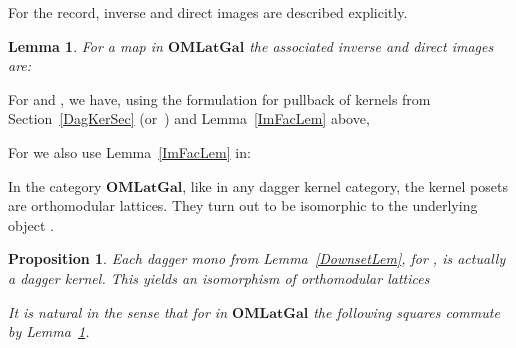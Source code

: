 \documentclass{article}
\newtheorem{lemma}[theorem]{Lemma}
\newtheorem{proposition}[theorem]{Proposition}
\newenvironment{proof}[1][Proof]{ \begin{trivlist}\item[\hskip \labelsep {\bfseries #1}]}{ \end{trivlist}}
\newcommand{\Cat}[1]{\ensuremath{\mathbf{#1}}}
\begin{document}
For the record, inverse and direct images are described explicitly.


\begin{lemma}
\label{InvDirImLem}
For a map  in \Cat{OMLatGal} the associated
inverse and direct images are:

\end{lemma}



\begin{proof}
For  and , we have, using the
formulation for pullback of kernels from Section~\ref{DagKerSec}
(or~\cite[Lemma~2.4]{HeunenJ09a}) and Lemma~\ref{ImFacLem} above,


\noindent For  we also use Lemma~\ref{ImFacLem}  in:

\end{proof}



In the category \Cat{OMLatGal}, like in any dagger kernel category,
the kernel posets  are orthomodular lattices. They turn out
to be isomorphic to the underlying object .



\begin{proposition}
\label{DownsetIsKerProp}
Each dagger mono  from
Lemma~\ref{DownsetLem}, for , is actually a dagger
kernel. This yields an isomorphism of orthomodular lattices


\noindent It is natural in the sense that for 
in \Cat{OMLatGal} the following squares commute by Lemma~\ref{InvDirImLem}.

\end{proposition}
\end{document}
